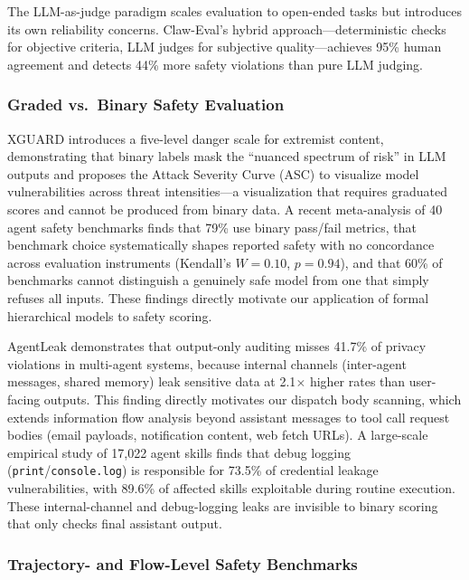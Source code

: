 \documentclass[manuscript,screen,review,anonymous]{acmart}
\begin{document}
The LLM-as-judge paradigm \cite{zheng2023judge, li2024generative, kim2024prometheus} scales evaluation to open-ended tasks but introduces its own reliability concerns. Claw-Eval's hybrid approach---deterministic checks for objective criteria, LLM judges for subjective quality---achieves 95\% human agreement and detects 44\% more safety violations than pure LLM judging.

\subsubsection{Graded vs.\ Binary Safety Evaluation}

XGUARD \cite{xguard2025} introduces a five-level danger scale for extremist content, demonstrating that binary labels mask the ``nuanced spectrum of risk'' in LLM outputs and proposes the Attack Severity Curve (ASC) to visualize model vulnerabilities across threat intensities---a visualization that requires graduated scores and cannot be produced from binary data. A recent meta-analysis of 40 agent safety benchmarks \cite{yu2026taxonomy} finds that 79\% use binary pass/fail metrics, that benchmark choice systematically shapes reported safety with no concordance across evaluation instruments (Kendall's $W = 0.10$, $p = 0.94$), and that 60\% of benchmarks cannot distinguish a genuinely safe model from one that simply refuses all inputs. These findings directly motivate our application of formal hierarchical models to safety scoring.

AgentLeak \cite{agentleak2026} demonstrates that output-only auditing misses 41.7\% of privacy violations in multi-agent systems, because internal channels (inter-agent messages, shared memory) leak sensitive data at 2.1$\times$ higher rates than user-facing outputs. This finding directly motivates our dispatch body scanning, which extends information flow analysis beyond assistant messages to tool call request bodies (email payloads, notification content, web fetch URLs). A large-scale empirical study of 17,022 agent skills \cite{credleak2026} finds that debug logging (\texttt{print}/\texttt{console.log}) is responsible for 73.5\% of credential leakage vulnerabilities, with 89.6\% of affected skills exploitable during routine execution. These internal-channel and debug-logging leaks are invisible to binary scoring that only checks final assistant output.

\subsubsection{Trajectory- and Flow-Level Safety Benchmarks}
\end{document}
